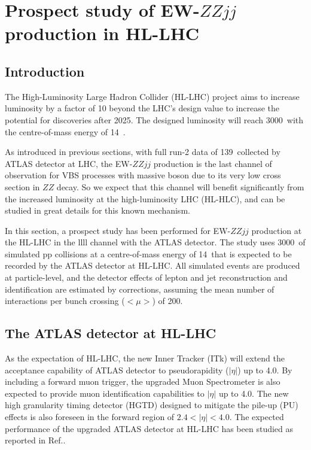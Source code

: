 \section{Prospect study of EW-$ZZjj$ production in HL-LHC}

\subsection{Introduction}
The High-Luminosity Large Hadron Collider (HL-LHC) project aims to increase luminosity by a factor of 10 beyond the LHC’s design value 
to increase the potential for discoveries after 2025.
The designed luminosity will reach 3000~\ifb with the centre-of-mass energy of 14~\tev.

As introduced in previous sections, with full run-2 data of 139~\ifb collected by ATLAS detector at LHC, 
the EW-$ZZjj$ production is the last channel of observation for VBS processes with massive boson 
due to its very low cross section in $ZZ$ decay.
So we expect that this channel will benefit significantly from the increased luminosity at the high-luminosity LHC (HL-HLC),
and can be studied in great details for this known mechanism.

In this section, a prospect study has been performed for EW-$ZZjj$ production at the HL-LHC in the llll channel with the ATLAS detector.
The study uses 3000~\ifb of simulated pp collisions at a centre-of-mass energy of 14~\tev that is expected to be recorded by the ATLAS detector at HL-LHC.
All simulated events are produced at particle-level, 
and the detector effects of lepton and jet reconstruction and identification are estimated by corrections, 
assuming the mean number of interactions per bunch crossing ($<\mu>$) of 200.

\subsection{The ATLAS detector at HL-LHC}

As the expectation of HL-LHC, the new Inner Tracker (ITk)\cite{Collaboration:2285585}
 will extend the acceptance capability of ATLAS detector to pseudorapidity ($|\eta|$) up to 4.0.
By including a forward muon trigger, the upgraded Muon Spectrometer\cite{Collaboration:2285580} is also expected to provide 
muon identification capabilities to $|\eta|$ up to 4.0.
The new high granularity timing detector (HGTD)\cite{Collaboration:2623663} designed to mitigate the pile-up (PU) effects 
is also foreseen in the forward region of $2.4 < |\eta| < 4.0$.
The expected performance of the upgraded ATLAS detector at HL-LHC has been studied as reported in Ref.\cite{ATL-PHYS-PUB-2016-026}.

